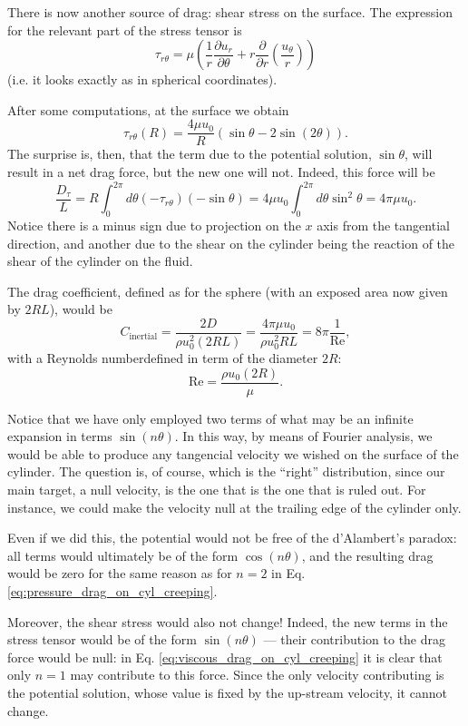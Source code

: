 There is now another source of drag: shear stress on the surface. The
expression for the relevant part of the stress tensor is
\[
  \tau_{r\theta} = \mu \left(
    \frac1r
    \frac{\partial u_r}{\partial \theta} +
    r \frac{\partial }{\partial r} \left( \frac{u_\theta}{r}\right) 
  \right) 
\]
(i.e. it looks exactly as in spherical coordinates).

After some computations, at the surface we obtain
\[
  \tau_{r\theta} (R)  =  \frac{4 \mu u_0}{R} \left(
    \sin\theta - 2 \sin(2\theta) 
  \right) .
\]
The surprise is, then, that the term due to the potential solution,
$\sin\theta$, will result in a net drag force, but the new one will
not. Indeed, this force will be
\begin{equation}
  \label{eq:viscous_drag_on_cyl_creeping}
  \frac{  D_\tau }{L} =
   R \int_0^{2\pi} d\theta  (- \tau_{r\theta}) (- \sin\theta)  =
  4 \mu u_0 \int_0^{2\pi} d\theta  \sin^2\theta  =  4 \pi \mu u_0 .
\end{equation}
Notice there is a minus sign due to projection on the $x$ axis from
the tangential direction, and another due to the shear on the cylinder
being the reaction of the shear of the cylinder on the fluid.

The drag coefficient, defined as for the sphere (with an exposed area
now given by $2RL$), would be
\[
  C_\mathrm{inertial} = \frac{  2 D }{ \rho u_0^2 (2 R L) } =
  \frac{ 4 \pi \mu u_0   }{ \rho u_0^2  R L } =
  8\pi \frac{1}{\mathrm{Re}} ,
\]
with a Reynolds numberdefined in term of the diameter $2R$:
\[
  \mathrm{Re} = \frac{ \rho u_0 ( 2 R ) }{ \mu } .
\]

Notice that we have only employed two terms of what may be an
infinite expansion in terms $\sin(n\theta)$. In this way, by means of
Fourier analysis, we would be able to produce any tangencial velocity
we wished on the surface of the cylinder. The question is, of course,
which is the ``right'' distribution, since our main target, a null
velocity, is the one that is the one that is ruled out. For instance,
we could make the velocity null at the trailing edge of the cylinder
only.

Even if we did this, the potential would not be free of the
d'Alambert's paradox: all terms would ultimately be of the form
$\cos(n\theta)$, and the resulting drag would be zero for the same
reason as for $n=2$ in Eq. \ref{eq:pressure_drag_on_cyl_creeping}.

Moreover, the shear stress would also not change! Indeed, the new
terms in the stress tensor would be of the form $\sin(n\theta)$ ---
their contribution to the drag force would be null: in Eq.
\ref{eq:viscous_drag_on_cyl_creeping} it is clear that only $n=1$ may
contribute to this force. Since the only velocity contributing is the
potential solution, whose value is fixed by the up-stream velocity, it
cannot change.
